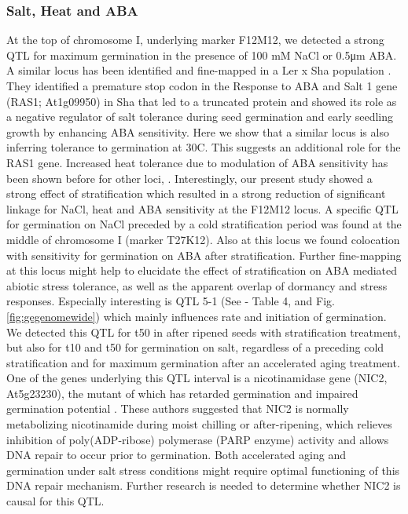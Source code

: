 \subsubsection{Salt, Heat and ABA}
At the top of chromosome I, underlying marker F12M12, we detected a strong QTL for maximum germination in 
the presence of 100 mM NaCl or 0.5μm ABA. A similar locus has been identified and fine-mapped in a 
Ler x Sha population \cite{Ren:2010}. They identified a premature stop codon in the Response to ABA and 
Salt 1 gene (RAS1; At1g09950) in Sha that led to a truncated protein and showed its role as a negative 
regulator of salt tolerance during seed germination and early seedling growth by enhancing ABA 
sensitivity. Here we show that a similar locus is also inferring tolerance to germination at 30\degree C. 
This suggests an additional role for the RAS1 gene. Increased heat tolerance due to modulation of 
ABA sensitivity has been shown before for other loci, \cite{Argyris:2008,Lee:2010}. 
Interestingly, our present study showed a strong effect of stratification which resulted in a strong 
reduction of significant linkage for NaCl, heat and ABA sensitivity at the F12M12 locus. A specific 
QTL for germination on NaCl preceded by a cold stratification period was found at the middle of 
chromosome I (marker T27K12). Also at this locus we found colocation with sensitivity for germination 
on ABA after stratification. Further fine-mapping at this locus might help to elucidate the effect 
of stratification on ABA mediated abiotic stress tolerance, as well as the apparent overlap of 
dormancy and stress responses. Especially interesting is QTL 5-1 (See \cite{Joosen:2011} - Table 4, and Fig. \ref{fig:gegenomewide}) which mainly 
influences rate and initiation of germination. We detected this QTL for t50 in after ripened seeds 
with stratification treatment, but also for t10 and t50 for germination on salt, regardless of a 
preceding cold stratification and for maximum germination after an accelerated aging treatment. 
One of the genes underlying this QTL interval is a nicotinamidase gene (NIC2, At5g23230), the mutant 
of which has retarded germination and impaired germination potential \cite{Hunt:2007}. These 
authors suggested that NIC2 is normally metabolizing nicotinamide during moist chilling or 
after-ripening, which relieves inhibition of poly(ADP-ribose) polymerase (PARP enzyme) activity and 
allows DNA repair to occur prior to germination. Both accelerated aging and germination under salt 
stress conditions might require optimal functioning of this DNA repair mechanism. Further research 
is needed to determine whether NIC2 is causal for this QTL.

